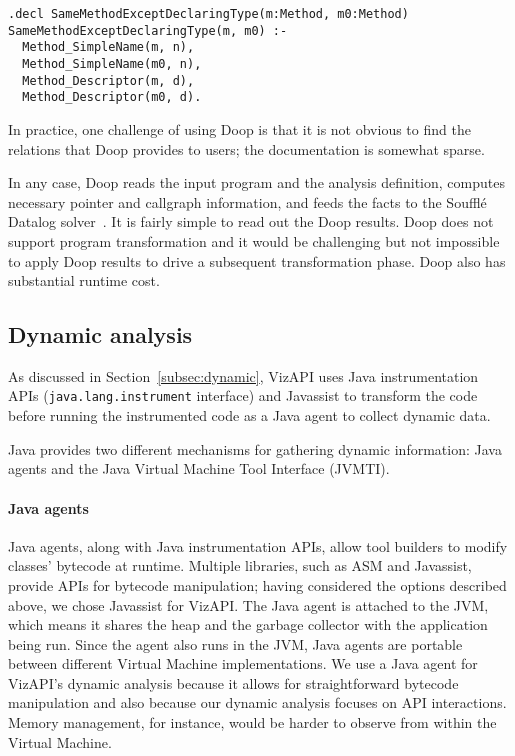 \begin{lstlisting}
.decl SameMethodExceptDeclaringType(m:Method, m0:Method)
SameMethodExceptDeclaringType(m, m0) :-
  Method_SimpleName(m, n),
  Method_SimpleName(m0, n),
  Method_Descriptor(m, d),
  Method_Descriptor(m0, d).
\end{lstlisting}

In practice, one challenge of using Doop is that it is not obvious to find
the relations that Doop provides to users; the documentation is
somewhat sparse.

In any case, Doop reads the input program and the analysis definition,
computes necessary pointer and callgraph information, and feeds the
facts to the Soufflé Datalog solver~\cite{DBLP:conf/cav/JordanSS16}. It is fairly simple to read out the
Doop results. Doop does not support program transformation and it would
be challenging but not impossible to apply Doop results to drive a subsequent transformation phase. Doop also
has substantial runtime cost.

\subsection{Dynamic analysis}
As discussed in Section~\ref{subsec:dynamic}, VizAPI uses Java instrumentation APIs (\texttt{java.lang.instrument} interface) and Javassist
to transform the code before running the instrumented code as a Java agent to collect
dynamic data.

Java provides two different mechanisms for gathering dynamic information: Java agents and the Java Virtual Machine Tool Interface (JVMTI).

\paragraph{Java agents}
Java agents, along with Java instrumentation APIs, allow tool builders to modify classes' bytecode at runtime.
Multiple libraries, such as ASM and Javassist, provide APIs for bytecode manipulation; having considered the options described above, we chose Javassist for VizAPI.  
The Java agent is attached to the JVM, which means it shares the heap and the garbage collector with the application being run.
Since the agent also runs in the JVM, Java agents are portable between different Virtual Machine implementations.
We use a Java agent for VizAPI's dynamic analysis because it allows for straightforward bytecode manipulation 
and also because our dynamic analysis focuses on API interactions. Memory management, for instance, would be harder to observe from within the Virtual Machine.


